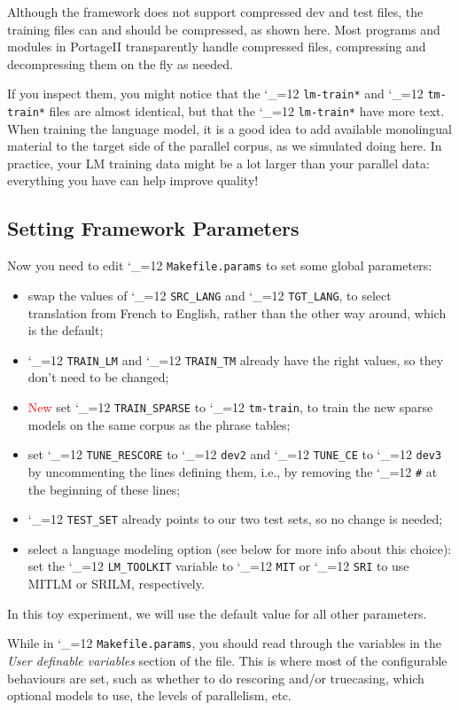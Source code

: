 \documentclass[11pt,letterpaper]{article}
\newcommand{\New}{\textcolor{red}{New }}
\newcommand{\PS}{PortageII\xspace}
\def\code{\begingroup\catcode`\_=12 \codex}
\newcommand{\codex}[1]{\texttt{#1}\endgroup}
\begin{document}
Although the framework does not support compressed dev and test files, the
training files can and should be compressed, as shown here.  Most programs and
modules in \PS transparently handle compressed files, compressing and
decompressing them on the fly as needed.

If you inspect them, you might notice that the \code{lm-train*} and
\code{tm-train*} files are almost identical, but that the \code{lm-train*} have
more text.  When training the language model, it is a good idea to add
available monolingual material to the target side of the parallel corpus, as we
simulated doing here.  In practice, your LM training data might be a lot larger
than your parallel data: everything you have can help improve quality!

\subsection{Setting Framework Parameters} \label{FrameworkParams}

Now you need to edit \code{Makefile.params} to set some global parameters:
\begin{itemize}
\item swap the values of \code{SRC_LANG} and
\code{TGT_LANG}, to select translation from French to English, rather than
the other way around, which is the default;
\item \code{TRAIN_LM} and \code{TRAIN_TM} already have the right values, so
they don't need to be changed;
\item \New set \code{TRAIN_SPARSE} to \code{tm-train}, to train the
new sparse models on the same corpus as the phrase tables;
\item set \code{TUNE_RESCORE} to \code{dev2} and \code{TUNE_CE} to \code{dev3}
by uncommenting the lines defining them, i.e., by removing the \code{\#} at the
beginning of these lines;
\item \code{TEST_SET} already points to our two test sets, so no change is
needed;
\item select a language modeling option (see below for more info about this
  choice): set the \code{LM_TOOLKIT} variable to \code{MIT} or \code{SRI} to
  use MITLM or SRILM, respectively.
\end{itemize}
In this toy experiment, we will use the default value for all other parameters.

While in \code{Makefile.params}, you should read through the variables in
the \emph{User definable variables} section of the file.  This is where most of
the configurable behaviours are set, such as whether to do rescoring and/or
truecasing, which optional models to use, the levels of parallelism, etc.
\end{document}
